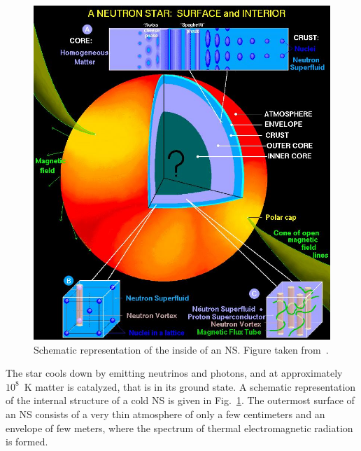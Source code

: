 \begin{figure}[!t]
\begin{center}
  \includegraphics[width=0.8\linewidth]{figures/NStarInt.jpeg}
\end{center}
\caption[Schematic representation of the inside of a neutron star]{Schematic
representation of the inside of an NS. Figure taken 
from~\cite{Page2006}.}\label{fig:NStarInt}
\end{figure}
% 
The star cools down by emitting neutrinos and photons, and at approximately
$10^8$~K matter is catalyzed, that is in its ground state.
A schematic representation of the internal structure of a cold NS is given in
Fig.~\ref{fig:NStarInt}.
The outermost surface of an NS consists of a very thin atmosphere of 
only a few centimeters and an envelope of few meters, where the spectrum of
thermal electromagnetic radiation is formed.  
